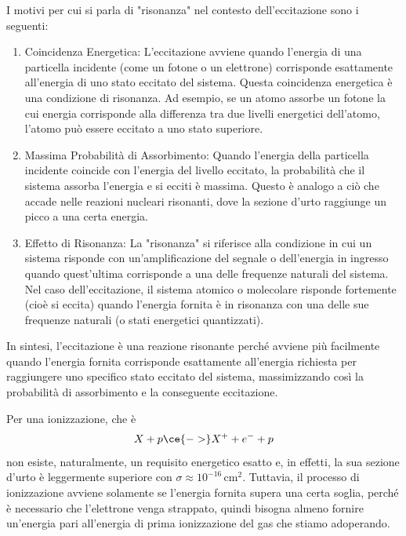 \begin{approfondimento}
   I motivi per cui si parla di "risonanza" nel contesto dell'eccitazione sono i seguenti:
   \begin{enumerate}[leftmargin=0.5cm]
      \item Coincidenza Energetica: L'eccitazione avviene quando l'energia di una particella incidente (come un fotone o un elettrone) corrisponde esattamente all'energia di uno stato eccitato del sistema. Questa coincidenza energetica è una condizione di risonanza. Ad esempio, se un atomo assorbe un fotone la cui energia corrisponde alla differenza tra due livelli energetici dell'atomo, l'atomo può essere eccitato a uno stato superiore.
      \item Massima Probabilità di Assorbimento: Quando l'energia della particella incidente coincide con l'energia del livello eccitato, la probabilità che il sistema assorba l'energia e si ecciti è massima. Questo è analogo a ciò che accade nelle reazioni nucleari risonanti, dove la sezione d'urto raggiunge un picco a una certa energia.
      \item Effetto di Risonanza: La "risonanza" si riferisce alla condizione in cui un sistema risponde con un'amplificazione del segnale o dell'energia in ingresso quando quest'ultima corrisponde a una delle frequenze naturali del sistema. Nel caso dell'eccitazione, il sistema atomico o molecolare risponde fortemente (cioè si eccita) quando l'energia fornita è in risonanza con una delle sue frequenze naturali (o stati energetici quantizzati).
   \end{enumerate}
   In sintesi, l'eccitazione è una reazione risonante perché avviene più facilmente quando l'energia fornita corrisponde esattamente all'energia richiesta per raggiungere uno specifico stato eccitato del sistema, massimizzando così la probabilità di assorbimento e la conseguente eccitazione.
\end{approfondimento}

Per una ionizzazione, che è
\begin{equation*}
   X + p \ce{->} X^+ + e^- + p
\end{equation*}
non esiste, naturalmente, un requisito energetico esatto e, in effetti, la sua sezione d'urto è leggermente superiore con $\sigma \approx 10^{-16} \, \text{cm}^2$. Tuttavia, il processo di ionizzazione avviene solamente se l'energia fornita supera una certa soglia, perché è necessario che l'elettrone venga strappato, quindi bisogna almeno fornire un'energia pari all'energia di prima ionizzazione del gas che stiamo adoperando.

